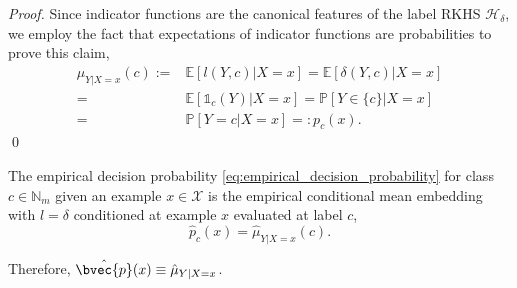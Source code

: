 \documentclass[runningheads, envcountsame, a4paper]{llncs}
\begin{document}
		\begin{proof} 
			Since indicator functions are the canonical features of the label \gls{RKHS} $\mathcal{H}_{\delta}$, we employ the fact that expectations of indicator functions are probabilities to prove this claim,
			\begin{equation}
			\begin{aligned}
				\mu_{Y | X = x}(c) :=& \mathbb{E}[l(Y, c) | X = x ]= \mathbb{E}[\delta(Y, c) | X = x] \\
				=& \mathbb{E}[\mathbb{1}_{c}(Y) | X = x] = \mathbb{P}[Y \in \{c\} | X = x] \\
				=& \mathbb{P}[Y = c | X = x] =: p_{c}(x).
			\end{aligned}
			\end{equation}
			\qed
		\end{proof}
		

		\begin{lemma}
			\label{thm:empirical_probability_is_embedding}
			The empirical decision probability \eqref{eq:empirical_decision_probability} for class $c \in \mathbb{N}_{m}$ given an example $x \in \mathcal{X}$ is the empirical conditional mean embedding with $l = \delta$ conditioned at example $x$ evaluated at label $c$,
			\begin{equation}
			\hat{p}_{c}(x) = \hat{\mu}_{Y | X = x}(c).
			\end{equation}
			
			Therefore, $\hat{\bvec{p}}(x) \equiv \hat{\mu}_{Y | X = x}$.
		\end{lemma}
		
\end{document}
